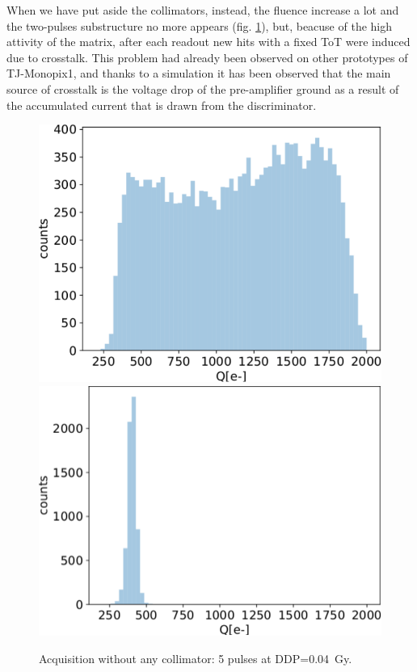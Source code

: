    When we have put aside the collimators, instead, the fluence increase a lot and the two-pulses substructure no more appears (fig. \ref{fig:without_collimator}), but, beacuse of the high attivity of the matrix, after each readout new hits with a fixed ToT were induced due to crosstalk.  
   This problem had already been observed on other prototypes of TJ-Monopix1, and thanks to a simulation it has been observed that the main source of crosstalk is the voltage drop of the pre-amplifier ground as a result of the accumulated current that is drawn from the discriminator.   
   \begin{figure}
      \centering
      \includegraphics[width=.49\linewidth]{figures/test_beam/Qe_17_32.pdf}
      \includegraphics[width=.49\linewidth]{figures/test_beam/noise_Qe_17_32.pdf}
      \caption{Acquisition without any collimator: 5 pulses at DDP=\SI{0.04}{Gy}.}
      \label{fig:without_collimator}
   \end{figure}





   